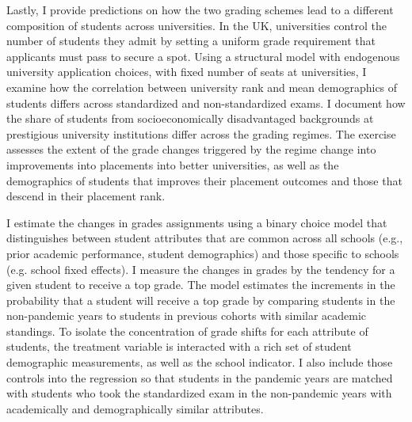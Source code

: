 Lastly, I provide predictions on how the two grading schemes lead to a different composition of students across universities. In the UK, universities control the number of students they admit by setting a uniform grade requirement that applicants must pass to secure a spot. Using a structural model with endogenous university application choices, with fixed number of seats at universities, I examine how the correlation between university rank and mean demographics of students differs across standardized and non-standardized exams. I document how the share of students from socioeconomically disadvantaged backgrounds at prestigious university institutions differ across the grading regimes. The exercise assesses the extent of the grade changes triggered by the regime change into improvements into placements into better universities, as well as the demographics of students that improves their placement outcomes and those that descend in their placement rank.

\vspace{1em}

I estimate the changes in grades assignments using a binary choice model that distinguishes between student attributes that are common across all schools (e.g., prior academic performance, student demographics) and those specific to schools (e.g. school fixed effects). I measure the changes in grades by the tendency for a given student to receive a top grade. The model estimates the increments in the probability that a student will receive a top grade by comparing students in the non-pandemic years to students in previous cohorts with similar academic standings. To isolate the concentration of grade shifts for each attribute of students, the treatment variable is interacted with a rich set of student demographic measurements, as well as the school indicator. I also include those controls into the regression so that students in the pandemic years are matched with students who took the standardized exam in the non-pandemic years with academically and demographically similar attributes. 

